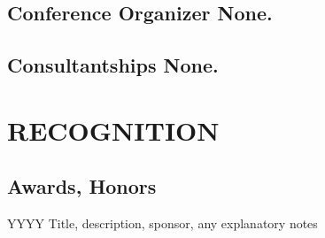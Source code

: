 \documentclass[11pt]{article}
\newenvironment{lyxlist}[1]
	{\begin{list}{}
		{\setlength\itemsep{-0.5ex}
		\settowidth{\labelwidth}{#1}
		 \setlength{\leftmargin}{\labelwidth}
		 \addtolength{\leftmargin}{\labelsep}
		 \renewcommand{\makelabel}[1]{##1\hfil}}}
	{\end{list}}
\begin{document}
\subsection*{Conference Organizer \normalfont\textcolor{color0}{None.}}

\subsection*{Consultantships \normalfont\textcolor{color0}{None.}}

\section*{RECOGNITION}

\subsection*{Awards, Honors}
\begin{lyxlist}{JHMI/regional}

\item[{YYYY}]Title, description, sponsor, any explanatory notes

\end{lyxlist}
\end{document}
